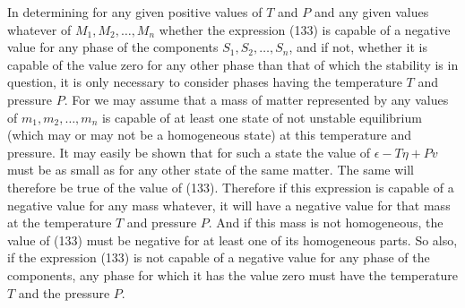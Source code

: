\documentclass[11pt]{article}
\newcommand{\eps}{\epsilon}
\begin{document}
In determining for any given positive values of \(T\) and \(P\) and any given values whatever of \(M_1,M_2,\ldots,M_n\) whether the expression (133) is capable of a negative value for any phase of the components \(S_1,S_2,\ldots,S_n\), and if not, whether it is capable of the value zero for any other phase than that of which the stability is in question, it is only necessary to consider phases having the temperature \(T\) and pressure \(P\). For we may assume that a mass of matter represented by any values of \(m_1,m_2,\ldots,m_n\) is capable of at least one state of not unstable equilibrium (which may or may not be a homogeneous state) at this temperature and pressure. It may easily be shown that for such a state the value of \(\eps-T\eta+Pv\) must be as small as for any other state of the same matter. The same will therefore be true of the value of (133). Therefore if this expression is capable of a negative value for any mass whatever, it will have a negative value for that mass at the temperature \(T\) and pressure \(P\). And if this mass is not homogeneous, the value of (133) must be negative for at least one of its homogeneous parts. So also, if the expression (133) is not capable of a negative value for any phase of the components, any phase for which it has the value zero must have the temperature \(T\) and the pressure \(P\).
\end{document}
